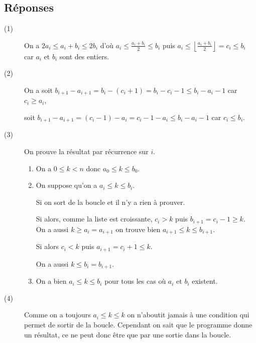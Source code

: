 \newpage
\subsection{Réponses}
\begin{description}
\item[(1)] On a  $2a_i \le a_i + b_i \le 2b_i$ d'où $a_i \le \frac{a_i + b_i}2 \le b_i$ puis $a_i \le \left\lfloor\frac{a_i + b_i}2\right\rfloor = c_i \le b_i$ car $a_i$ et $b_i$ sont des entiers.

\item[(2)] On a soit $b_{i+1} - a_{i+1} = b_i - (c_i+1) = b_i - c_i - 1\le b_i-a_i-1$ car $c_i \ge a_i$,

soit $b_{i+1} - a_{i+1} = (c_i-1) - a_i= c_i - 1 -a_i\le b_i-a_i-1$ car $c_i \le b_i$.

\item[(3)] On prouve la résultat par récurrence sur $i$.

\begin{enumerate}
    \item On a $0 \le k < n$ donc $a_0 \le k \le b_0$.
 \item On suppose qu'on a $a_i \le k \le b_i$.
 
 Si  on sort de la boucle et il n'y a rien à prouver.
 
 Si  alors, comme la liste est croissante,   $c_i > k$ puis $b_{i+1} = c_i - 1 \ge k$. On a aussi $k\ge a_i = a_{i+1}$ on trouve bien $a_{i+1} \le k \le b_{i+1}$.
 
Si  alors $c_i < k$ puis $a_{i+1} = c_i + 1 \le k$. 

On a aussi $k\le b_i = b_{i+1}$.

\item On a bien $a_i \le k \le b_i$ pour tous les cas où $a_i$ et $b_i$ existent.
 
\end{enumerate}

\item[(4)] Comme on a toujours $a_i\le k\le k$ on n'aboutit jamais à une condition  qui permet de sortir de la boucle. Cependant on sait que le programme donne un résultat, ce ne peut donc être que par une sortie  dans la boucle.


\end{description}
